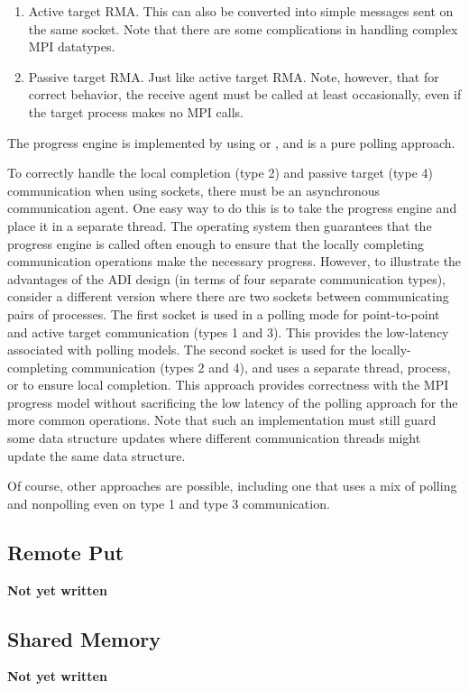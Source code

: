 {\begin{enumerate}
\item Active target RMA.  This can also be converted into simple
messages sent on the same socket.  Note that there are some
complications in handling complex MPI datatypes.

\item Passive target RMA.  Just like active target RMA.  Note,
however, that for correct behavior, the receive agent must be called
at least occasionally, even if the target process makes no MPI calls.
\end{enumerate}

The progress engine is implemented by using  or , and
is a pure polling approach. 

To correctly handle the local completion (type 2) and passive target
(type 4) communication when using sockets, there must be an
asynchronous communication agent.  One easy way to do this is to take
the progress engine and place it in a separate thread.  The operating
system then guarantees that the progress engine is called often enough
to ensure that the locally completing communication operations make
the necessary progress.  However, to illustrate the advantages of the
ADI design (in terms of four separate communication types), consider a
different version where there are two sockets   
between communicating pairs of processes.  The first socket is used in
a polling mode for point-to-point and active target communication
(types 1 and 3).  This provides the low-latency associated with
polling models.  The second socket is used for the locally-completing
communication (types 2 and 4), and uses a separate thread, process, or
 to ensure local completion.  This approach provides correctness
with the MPI progress model without sacrificing the low latency of the
polling approach for the more common operations.  Note that such an
implementation must still guard some data structure updates where
different communication threads might update the same data structure.

Of course, other approaches are possible, including one that uses a
mix of polling and nonpolling even on type 1 and type 3 communication.

\subsection{Remote Put}
\textbf{Not yet written}

\subsection{Shared Memory}
\textbf{Not yet written}

}
